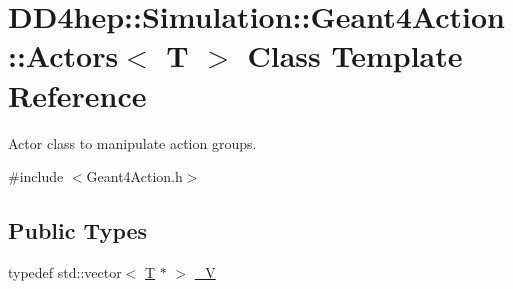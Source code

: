 \hypertarget{class_d_d4hep_1_1_simulation_1_1_geant4_action_1_1_actors}{}\section{D\+D4hep\+:\+:Simulation\+:\+:Geant4\+Action\+:\+:Actors$<$ T $>$ Class Template Reference}
\label{class_d_d4hep_1_1_simulation_1_1_geant4_action_1_1_actors}


Actor class to manipulate action groups.  




{\ttfamily \#include $<$Geant4\+Action.\+h$>$}

\subsection*{Public Types}
\begin{DoxyCompactItemize}
\item 
typedef std\+::vector$<$ \hyperlink{class_t}{T} $\ast$ $>$ \hyperlink{class_d_d4hep_1_1_simulation_1_1_geant4_action_1_1_actors_a18b6dfb1542a2cd036d8317db48f6c16}{\+\_\+V}
\end{DoxyCompactItemize}
